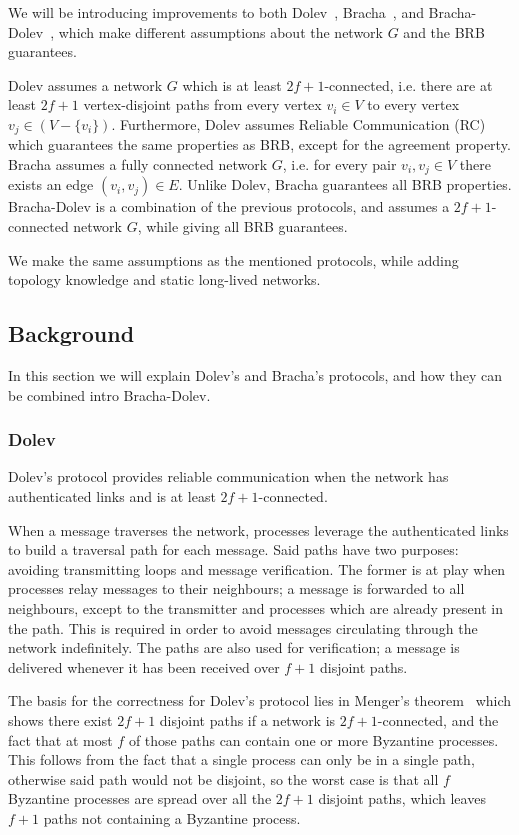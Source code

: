 We will be introducing improvements to both Dolev~\cite{dolev}, Bracha~\cite{bracha}, and Bracha-Dolev~\cite{bracha-dolev}, which make different assumptions about the network $G$ and the BRB guarantees.

Dolev assumes a network $G$ which is at least $2f+1$-connected, i.e. there are at least $2f+1$ vertex-disjoint paths from every vertex $v_i \in V$ to every vertex $v_j \in (V - \{v_i\})$. Furthermore, Dolev assumes Reliable Communication (RC) which guarantees the same properties as BRB, except for the agreement property. Bracha assumes a fully connected network $G$, i.e. for every pair $v_i,v_j \in V$ there exists an edge $(v_i, v_j) \in E$. Unlike Dolev, Bracha guarantees all BRB properties. Bracha-Dolev is a combination of the previous protocols, and assumes a $2f+1$-connected network $G$, while giving all BRB guarantees.

We make the same assumptions as the mentioned protocols, while adding topology knowledge and static long-lived networks.

\subsection*{Background}
In this section we will explain Dolev's and Bracha's protocols, and how they can be combined intro Bracha-Dolev.

\subsubsection{Dolev}
Dolev's protocol provides reliable communication when the network has authenticated links and is at least $2f+1$-connected.

When a message traverses the network, processes leverage the authenticated links to build a traversal path for each message. Said paths have two purposes: avoiding transmitting loops and message verification. 
The former is at play when processes relay messages to their neighbours; a message is forwarded to all neighbours, except to the transmitter and processes which are already present in the path. This is required in order to avoid messages circulating through the network indefinitely.
The paths are also used for verification; a message is delivered whenever it has been received over $f+1$ disjoint paths.

The basis for the correctness for Dolev's protocol lies in Menger's theorem~\cite{menger} which shows there exist $2f+1$ disjoint paths if a network is $2f+1$-connected, and the fact that at most $f$ of those paths can contain one or more Byzantine processes. This follows from the fact that a single process can only be in a single path, otherwise said path would not be disjoint, so the worst case is that all $f$ Byzantine processes are spread over all the $2f+1$ disjoint paths, which leaves $f+1$ paths not containing a Byzantine process.

